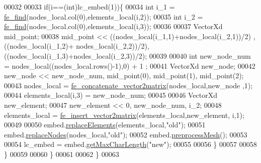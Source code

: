 \begin{DoxyCode}
00032 
00033             \textcolor{keywordflow}{if}(i==(\textcolor{keywordtype}{int})lc\_embed(1))\{
00034                  \textcolor{keywordtype}{int} i\_1 = \hyperlink{functions_8h_a983304137f9a961469a558437d5d2d59}{fe\_find}(nodes\_local.col(0),elements\_local(i,2));
00035                  \textcolor{keywordtype}{int} i\_2 = \hyperlink{functions_8h_a983304137f9a961469a558437d5d2d59}{fe\_find}(nodes\_local.col(0),elements\_local(i,3));
00036                  
00037                  VectorXd mid\_point;
00038                  mid\_point << ((nodes\_local(i\_1,1)+nodes\_local(i\_2,1))/2) , ((nodes\_local(i\_1,2)+
      nodes\_local(i\_2,2))/2), ((nodes\_local(i\_1,3)+nodes\_local(i\_2,3))/2);
00039                 
00040                 \textcolor{keywordtype}{int} new\_node\_num = nodes\_local((nodes\_local.rows()-1),0) + 1 ;
00041                 VectorXd new\_node;
00042                 new\_node << new\_node\_num, mid\_point(0), mid\_point(1), mid\_point(2);
00043                 nodes\_local = \hyperlink{functions_8h_ac2d90cb6719488bc8551e6f9437f4f76}{fe\_concatenate\_vector2matrix}(nodes\_local,new\_node
      ,1);
00044                 elements\_local(i,3) = new\_node\_num;
00045                 
00046                 VectorXd new\_element;
00047                 new\_element << 0, new\_node\_num, i\_2;
00048                 elements\_local = \hyperlink{functions_8h_a94d7770f842e44e01a47ae5624bd7749}{fe\_insert\_vector2matrix}(elements\_local,new\_element,
      i,1);
00049 
00050                 embed.\hyperlink{class_mesh_a95ba7a96ec42ea4e0c191890f7faa2ab}{replaceElements}(elements\_local,\textcolor{stringliteral}{"old"});
00051                 embed.\hyperlink{class_mesh_af03b49cbaf762652c9ff5ff7f4a6e668}{replaceNodes}(nodes\_local,\textcolor{stringliteral}{"old"});
00052                 embed.\hyperlink{class_mesh_aa8a6f260e9589be4c0a2fcc146e696d5}{preprocessMesh}();
00053 
00054                 lc\_embed = embed.\hyperlink{class_mesh_a72d2a3863b85a2a2aed7deca8ce37832}{getMaxCharLength}(\textcolor{stringliteral}{"new"});
00055 
00056             \}
00057 
00058         \}
00059 
00060     \}
00061 
00062 \}
00063 
\end{DoxyCode}
